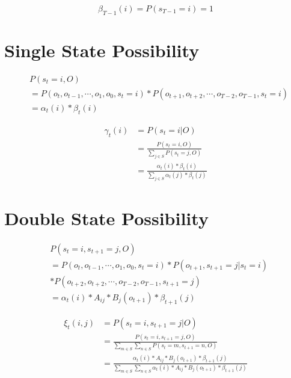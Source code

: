 \documentclass[a4paper,12pt]{article}
\begin{document}
        \begin{equation}
            \beta_{T-1}(i)=P(s_{T-1}=i)=1
        \end{equation}

    \section{Single State Possibility}

        \begin{equation}
            \begin{split}
                &P(s_t=i,O)\\
                &=P(o_t,o_{t-1},\cdots,o_1,o_0,s_t=i)*P(o_{t+1},o_{t+2},\cdots,o_{T-2},o_{T-1},s_t=i)\\
                &=\alpha_t(i)*\beta_t(i)
            \end{split}
        \end{equation}

        \begin{equation}
            \begin{split}
                \gamma_t(i)&=P(s_t=i|O)\\
                &=\frac{P(s_t=i,O)}{\sum_{j\in S} P(s_t=j,O)}\\
                &=\frac{\alpha_t(i)*\beta_t(i)}{\sum_{j\in S}\alpha_t(j)*\beta_t(j)}
            \end{split}
        \end{equation}
    
    \section{Double State Possibility}

        \begin{equation}
            \begin{split}
                &P(s_t=i,s_{t+1}=j,O)\\
                &=P(o_t,o_{t-1},\cdots,o_1,o_0,s_t=i)*P(o_{t+1},s_{t+1}=j|s_t=i)\\
                &*P(o_{t+2},o_{t+2},\cdots,o_{T-2},o_{T-1},s_{t+1}=j)\\
                &=\alpha_t(i)*A_{ij}*B_j(o_{t+1})*\beta_{t+1}(j)
            \end{split}
        \end{equation}

        \begin{equation}
            \begin{split}
                \xi_t(i,j)&=P(s_t=i,s_{t+1}=j|O)\\
                &=\frac{P(s_t=i,s_{t+1}=j,O)}{\sum_{m\in S}\sum_{n\in S} P(s_t=m,s_{t+1}=n,O)}\\
                &=\frac{\alpha_t(i)*A_{ij}*B_j(o_{t+1})*\beta_{t+1}(j)}{\sum_{m\in S}\sum_{n\in S} \alpha_t(i)*A_{ij}*B_j(o_{t+1})*\beta_{t+1}(j)}
            \end{split}
        \end{equation}
\end{document}
